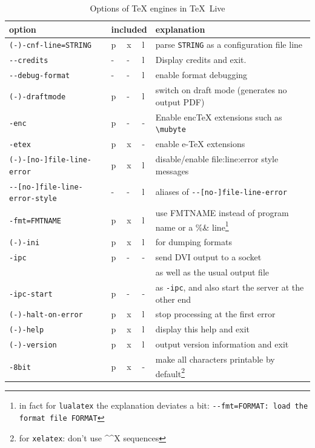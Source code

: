 \documentclass[a4paper]{article}%
\newcommand{\lualatex}{\texttt{lualatex}}
\newcommand{\xelatex}{\texttt{xelatex}}
\newcommand{\texlive}{\TeX~Live}
\begin{document}
{\footnotesize
\begin{longtable}{lllll}
\toprule
option & \multicolumn{3}{l}{included} & explanation \\
\midrule
\midrule
\endfirsthead%
\bottomrule
\caption{\label{tab:latexOptionsCommonTexlive} Options of \TeX{} engines in \texlive}
\endlastfoot%
\texttt{(-)-cnf-line=STRING}       & p&x&l & parse \texttt{STRING} as a configuration file line \\
\texttt{-{}-credits}               & -&-&l & Display credits and exit. \\
\texttt{-{}-debug-format}          & -&-&l & enable format debugging \\
\texttt{(-)-draftmode}             & p&-&l & switch on draft mode (generates no output PDF) \\
\texttt{-enc}                      & p&-&- & Enable encTeX extensions such as \texttt{\textbackslash{}mubyte} \\
\texttt{-etex}                     & p&x&- & enable e-TeX extensions \\
\texttt{(-)-[no-]file-line-error}  & p&x&l & disable/enable file:line:error style messages \\
\texttt{-{}-[no-]file-line-error-style} & -&-&l& aliases of \texttt{-{}-[no-]file-line-error} \\
\texttt{-fmt=FMTNAME}              & p&x&l & use FMTNAME instead of program name or a \%\& line\footnote%
{in fact for \lualatex{} the explanation deviates a bit: \texttt%
{-{}-fmt=FORMAT\@: load the format file FORMAT}} \\
\texttt{(-)-ini}                   & p&x&l & for dumping formats \\
\texttt{-ipc}                      & p&-&- & send DVI output to a socket \\
                                   &  & &  & as well as the usual output file \\
\texttt{-ipc-start}                & p&-&- & as \texttt{-ipc}, and also start the server at the other end \\
\texttt{(-)-halt-on-error}         & p&x&l & stop processing at the first error \\
\texttt{(-)-help}                  & p&x&l & display this help and exit \\
\texttt{(-)-version}               & p&x&l & output version information and exit \\
\texttt{-8bit}                     & p&x&- & make all characters printable by default\footnote%
{for \xelatex: don't use \^{}\^{}X sequences} \\

\end{longtable}}
\end{document}
